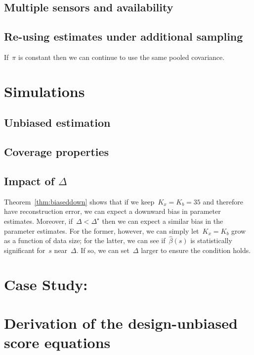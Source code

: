 \documentclass[12pt]{amsart}
\begin{document}
\subsection{Multiple sensors and availability}



\subsection{Re-using estimates under additional sampling}

If~$\pi$ is constant then we can continue to use the same pooled
covariance. 


\section{Simulations}

\subsection{Unbiased estimation}

\subsection{Coverage properties}

\subsection{Impact of $\Delta$}

Theorem~\ref{thm:biaseddown} shows that if we keep~$K_x = K_b = 35$
and therefore have reconstruction error, we can expect a downward bias
in parameter estimates.
Moreover, if~$\Delta < \Delta^\star$ then we can expect a similar bias
in the parameter estimates.  For the former, however, we can simply
let~$K_x = K_b$ grow as a function of data size; for the latter, we
can see if~$\hat \beta(s)$ is statistically significant for~$s$
near~$\Delta$. If so, we can set~$\Delta$ larger to ensure the
condition holds.

\section{Case Study: }




\appendix

\section{Derivation of the design-unbiased score equations}
\end{document}
